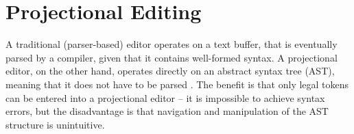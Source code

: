 

\section{Projectional Editing}
A traditional (parser-based) editor operates on a text buffer, that is eventually parsed by a compiler, given that it contains well-formed syntax. A projectional editor, on the other hand, operates directly on an abstract syntax tree (AST), meaning that it does not have to be parsed \cite{voelter2014towards}. The benefit is that only legal tokens can be entered into a projectional editor -- it is impossible to achieve syntax errors, but the disadvantage is that navigation and manipulation of the AST structure is unintuitive. 

